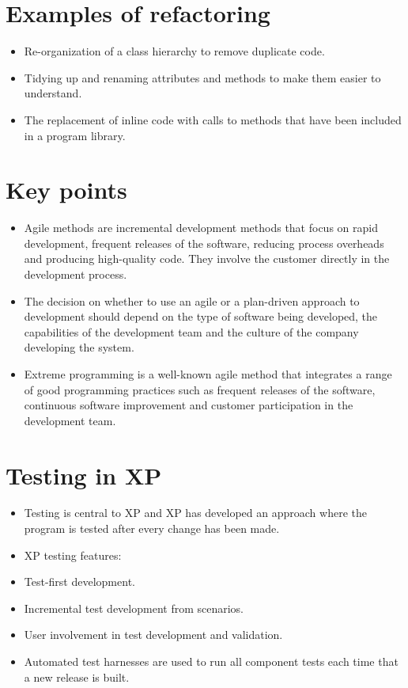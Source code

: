 \section{ Examples of refactoring}
\begin{itemize}

\item Re-organization of a class hierarchy to remove duplicate code.

\item Tidying up and renaming attributes and methods to make them easier to understand.

\item The replacement of inline code with calls to methods that have been included in a program library.

\end{itemize}
\section{ Key points}
\begin{itemize}

\item Agile methods are incremental development methods that focus on rapid development, frequent releases of the software, reducing process overheads and producing high-quality code. They involve the customer directly in the development process.

\item The decision on whether to use an agile or a plan-driven approach to development should depend on the type of software being developed, the capabilities of the development team and the culture of the company developing the system.

\item Extreme programming is a well-known agile method that integrates a range of good programming practices such as frequent releases of the software, continuous software improvement and customer participation in the development team.


\end{itemize}
\section{ Testing in XP}
\begin{itemize}

\item Testing is central to XP and XP has developed an approach where the program is tested after every change has been made.

\item XP testing features: \item Test-first development.
\item Incremental test development from scenarios. \item User involvement in test development and validation.
\item Automated test harnesses are used to run all component tests each time that a new release is built.

\end{itemize}
